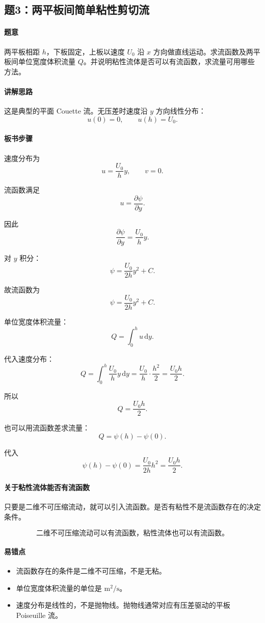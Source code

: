 ﻿\documentclass[12pt,a4paper]{ctexart}
\newcommand{\dd}{\mathrm d}
\begin{document}
\subsection*{题3：两平板间简单粘性剪切流}

\paragraph{题意}
两平板相距 $h$，下板固定，上板以速度 $U_0$ 沿 $x$ 方向做直线运动。求流函数及两平板间单位宽度体积流量 $Q$。并说明粘性流体是否可以有流函数，求流量可用哪些方法。

\paragraph{讲解思路}
这是典型的平面 Couette 流。无压差时速度沿 $y$ 方向线性分布：
\[
u(0)=0,\qquad u(h)=U_0.
\]

\paragraph{板书步骤}
速度分布为
\[
\boxed{
u=\frac{U_0}{h}y,\qquad v=0.
}
\]

流函数满足
\[
u=\frac{\partial\psi}{\partial y}.
\]

因此
\[
\frac{\partial\psi}{\partial y}
=\frac{U_0}{h}y.
\]

对 $y$ 积分：
\[
\psi=\frac{U_0}{2h}y^2+C.
\]

故流函数为
\[
\boxed{
\psi=\frac{U_0}{2h}y^2+C.
}
\]

单位宽度体积流量：
\[
Q=\int_0^h u\,\dd y.
\]

代入速度分布：
\[
Q=\int_0^h \frac{U_0}{h}y\,\dd y
=\frac{U_0}{h}\cdot\frac{h^2}{2}
=\frac{U_0h}{2}.
\]

所以
\[
\boxed{
Q=\frac{U_0h}{2}.
}
\]

也可以用流函数差求流量：
\[
Q=\psi(h)-\psi(0).
\]

代入
\[
\psi(h)-\psi(0)
=\frac{U_0}{2h}h^2
=\frac{U_0h}{2}.
\]

\paragraph{关于粘性流体能否有流函数}
只要是二维不可压缩流动，就可以引入流函数。是否有粘性不是流函数存在的决定条件。

\[
\boxed{
\text{二维不可压缩流动可以有流函数，粘性流体也可以有流函数。}
}
\]

\paragraph{易错点}
\begin{itemize}
  \item 流函数存在的条件是二维不可压缩，不是无粘。
  \item 单位宽度体积流量的单位是 $\mathrm{m^2/s}$。
  \item 速度分布是线性的，不是抛物线。抛物线通常对应有压差驱动的平板 Poiseuille 流。
\end{itemize}
\end{document}
